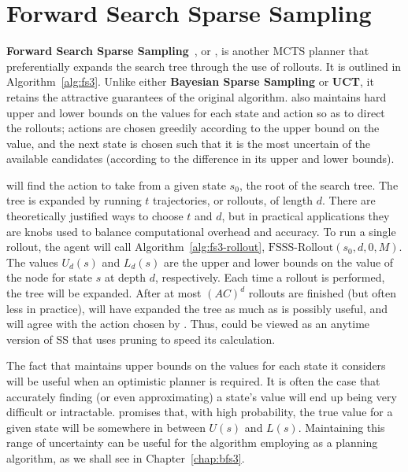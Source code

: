 \section{Forward Search Sparse Sampling}

{\bf Forward Search Sparse Sampling}~\cite{walsh10}, or , is another MCTS planner that preferentially expands the search tree through the use of rollouts. It is outlined in Algorithm~\ref{alg:fs3}. Unlike either {\bf Bayesian Sparse Sampling} or {\bf UCT}, it retains the attractive guarantees of the original  algorithm.  also maintains hard upper and lower bounds on the values for each state and action so as to direct the rollouts; actions are chosen greedily according to the upper bound on the value, and the next state is chosen such that it is the most uncertain of the available candidates (according to the difference in its upper and lower bounds).

 will find the action to take from a given state $s_0$, the root of the search tree.  The tree is expanded by running $t$ trajectories, or rollouts, of length $d$. There are theoretically justified ways to choose $t$ and $d$, but in practical applications they are knobs used to balance computational overhead and accuracy. To run a single rollout, the agent will call Algorithm~\ref{alg:fs3-rollout}, $\mbox{FSSS-Rollout}(s_0, d, 0, M)$.
The values $U_d(s)$ and $L_d(s)$ are the upper and lower bounds on the value of the node for state $s$ at depth $d$, respectively. Each time a rollout is performed, the tree will be expanded. After at most $(AC)^d$ rollouts are finished (but often less in practice),  will have expanded the tree as much as is possibly useful, and will agree with the action chosen by . Thus,  could be viewed as an anytime version of SS that uses pruning to speed its calculation.

The fact that  maintains upper bounds on the values for each state it considers will be useful when an optimistic planner is required. It is often the case that accurately finding (or even approximating) a state's value will end up being very difficult or intractable.  promises that, with high probability, the true value for a given state will be somewhere in between $U(s)$ and $L(s)$. Maintaining this range of uncertainty can be useful for the algorithm employing  as a planning algorithm, as we shall see in Chapter~\ref{chap:bfs3}.

